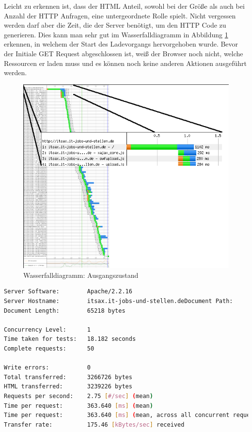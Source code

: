 Leicht zu erkennen ist, dass der HTML Anteil, sowohl bei der Größe als auch bei Anzahl der HTTP Anfragen, eine untergeordnete Rolle spielt. Nicht vergessen werden darf aber die Zeit, die der Server benötigt, um den HTTP Code zu generieren. Dies kann man sehr gut im Wasserfalldiagramm in Abbildung \ref{fig:startwaterfall} erkennen, in welchem der Start des Ladevorgangs hervorgehoben wurde. Bevor der Initiale GET Request abgeschlossen ist, weiß der Browser noch nicht, welche Ressourcen er laden muss und es können noch keine anderen Aktionen ausgeführt werden.
\begin{figure}[!ht]
  \centering
  \includegraphics[scale=0.5]{material/start_waterfall_edited.png}
  \caption{Wasserfalldiagramm: Ausgangszustand}
  \label{fig:startwaterfall}
\end{figure}



\begin{minipage}[t]{\textwidth}
\begin{lstlisting}[language=bash,label=Startwerte gemessen mit ab,caption=Startwerte gemessen mit ab]
Server Software:        Apache/2.2.16
Server Hostname:        itsax.it-jobs-und-stellen.deDocument Path:          /
Document Length:        65218 bytes

Concurrency Level:      1
Time taken for tests:   18.182 seconds
Complete requests:      50

Write errors:           0
Total transferred:      3266726 bytes
HTML transferred:       3239226 bytes
Requests per second:    2.75 [#/sec] (mean)
Time per request:       363.640 [ms] (mean)
Time per request:       363.640 [ms] (mean, across all concurrent requests)
Transfer rate:          175.46 [kBytes/sec] received
\end{lstlisting}
\end{minipage}

